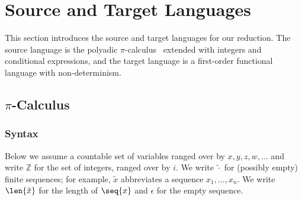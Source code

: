 \section{Source and Target Languages}  \label{sec:targetlanguage}

This section introduces the source and target languages for our reduction.
The source language is the
polyadic \(\pi\)-calculus~\cite{milner1993polyadic} extended with
integers and conditional expressions,
and the target language is a first-order functional language with non-determinism.


\subsection{$\pi$-Calculus}
\subsubsection{Syntax}

Below we assume
a countable set of variables ranged over by \(x, y, z, w,\!\ldots\)
and write \( \mathbb{Z} \) for the set of integers, ranged
over by \( i \).  We write $\tilde{\cdot}$ for (possibly empty) finite
sequences; for example, $\tilde{x}$ abbreviates a sequence
$x_1,\dots,x_n$.  We write \( \len{\tilde{x}} \) for the length of \(\seq{x}\) and
\(\epsilon\) for the empty sequence.

